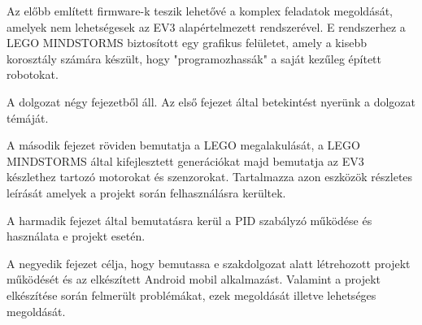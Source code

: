 Az előbb említett firmware-k teszik lehetővé a komplex feladatok megoldását, amelyek nem lehetségesek az EV3 alapértelmezett rendszerével. E rendszerhez a LEGO MINDSTORMS biztosított egy grafikus felületet, amely a kisebb korosztály számára készült, hogy "programozhassák" a saját kezűleg épített robotokat.

A dolgozat négy fejezetből áll. Az első fejezet által betekintést nyerünk a dolgozat témáját. 

A második fejezet röviden bemutatja a LEGO megalakulását, a LEGO MINDSTORMS által kifejlesztett generációkat majd bemutatja az EV3 készlethez tartozó motorokat és szenzorokat. Tartalmazza azon eszközök részletes leírását amelyek a projekt során felhasználásra kerültek.

A harmadik fejezet által bemutatásra kerül a PID szabályzó működése és használata e projekt esetén.

A negyedik fejezet célja, hogy bemutassa e szakdolgozat alatt létrehozott projekt működését és az elkészített Android mobil alkalmazást. Valamint a projekt elkészítése során felmerült problémákat, ezek megoldását illetve lehetséges megoldását.